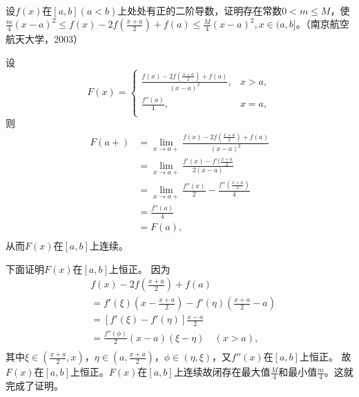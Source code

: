  \begin{exercise}
  \hfill\\
 设$f(x)$在$[a,b](a<b)$上处处有正的二阶导数，证明存在常数$0<m\leq M$，使$\frac m4(x-a)^2\leq f(x)-2f(\frac{x+a}2)+f(a)\leq \frac M4(x-a)^2,x\in(a,b]$。（南京航空航天大学，2003） 
  
  设$$F(x)=
  \begin{cases}
  \frac{f(x)-2f(\frac{x+a}{2})+f(a)}{(x-a)^2},&x>a,\\
  \frac{f''(a)}{4},&x=a,\\
  \end{cases}
  $$
  则
  \begin{align*}
  F(a+)&=\lim_{x\rightarrow a+}\frac{f(x)-2f(\frac{x+a}{2})+f(a)}{(x-a)^2}\\
  &=\lim_{x\rightarrow a+}\frac{f'(x)-f'(\frac{x+a}{2}}{2(x-a)}\\
  &=\lim_{x\rightarrow a+}\frac{f''(x)}{2}-\frac{f''(\frac{x+a}{2})}{4}\\
  &=\frac{f''(a)}{4}\\
  &=F(a),\\
  \end{align*}
  从而$F(x)$在$[a,b]$上连续。
  
  下面证明$F(x)$在$[a,b]$上恒正。
 因为
 \begin{align*}
 &f(x)-2f(\frac{x+a}{2})+f(a)\\
 &=f'(\xi)(x-\frac{x+a}{2})-f'(\eta)(\frac{x+a}{2}-a)\\
 &=[f'(\xi)-f'(\eta)]\frac{x-a}{2}\\
 &=\frac{f''(\phi)}2(x-a)(\xi-\eta)\quad(x>a),\\
 \end{align*}
 其中$\xi\in(\frac{x+a}{2},x)$，$\eta\in(a,\frac{x+a}{2})$，$\phi\in(\eta,\xi)$，又$f''(x)$在$[a,b]$上恒正。
 故$F(x)$在$[a,b]$上恒正。$F(x)$在$[a,b]$上连续故闭存在最大值$\frac{M}{4}$和最小值$\frac{m}{4}$。这就完成了证明。  
  \end{exercise}  
  
  \hfill\\


